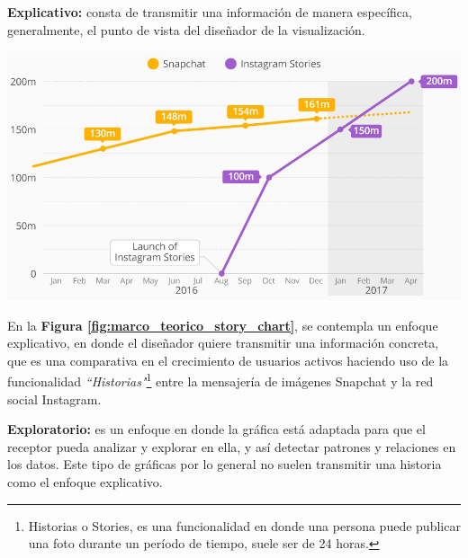 \textbf{Explicativo:} consta de transmitir una información de manera específica, generalmente, el punto de vista del diseñador de la visualización.

\begin{center}
    \bigbreak
    \includegraphics[scale=0.35]{images/marco_teorico/story_chart.png}
    \label{fig:marco_teorico_story_chart}
    \bigbreak
\end{center}

En la \textbf{Figura \ref{fig:marco_teorico_story_chart}}, se contempla un enfoque explicativo, en donde el diseñador quiere transmitir una información concreta, que es una comparativa en el crecimiento de usuarios activos haciendo uso de la funcionalidad \textit{“Historias"}\footnote{Historias o Stories, es una funcionalidad en donde una persona puede publicar una foto durante un período de tiempo, suele ser de 24 horas.} entre la mensajería de imágenes Snapchat y la red social Instagram.

\textbf{Exploratorio:} es un enfoque en donde la gráfica está adaptada para que el receptor pueda analizar y explorar en ella, y así detectar patrones y relaciones en los datos. Este tipo de gráficas por lo general no suelen transmitir una historia como el enfoque explicativo.

